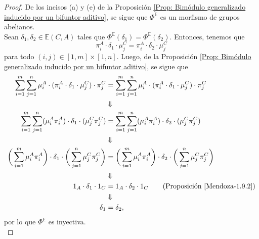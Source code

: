 \documentclass[tesis]{subfiles}
\begin{document}
\begin{proof}

    De los incisos (a) y (e) de la Proposición \ref{Prop: Bimódulo generalizado inducido por un bifuntor aditivo}, se sigue que $\Phi^\mathbb{E}$ es un morfismo de grupos abelianos. \\

    Sean $\delta_1,\delta_2\in\mathbb{E}(C,A)$ tales que $\Phi^\mathbb{E}(\delta_1) = \Phi^\mathbb{E}(\delta_2)$. Entonces, tenemos que
    \begin{equation*}
        \pi_i^A\cdot\delta_1\cdot\mu_j^C = \pi_i^A\cdot\delta_2\cdot\mu_j^C
    \end{equation*}
    para todo $(i,j)\in[1,m]\times[1,n]$. Luego, de la Proposición \ref{Prop: Bimódulo generalizado inducido por un bifuntor aditivo}, se sigue que
    \begin{align*}
        \sum_{i=1}^m \sum_{j=1}^n \mu_i^A\cdot(\pi_i^A\cdot\delta_1\cdot\mu_j^C)\cdot\pi_j^C &= \sum_{i=1}^m \sum_{j=1}^n \mu_i^A\cdot(\pi_i^A\cdot\delta_1\cdot\mu_j^C)\cdot\pi_j^C \\
                                                                                             &\Downarrow \\
        \sum_{i=1}^m \sum_{j=1}^n (\mu_i^A\pi_i^A)\cdot\delta_1\cdot(\mu_j^C\pi_j^C) &= \sum_{i=1}^m \sum_{j=1}^n (\mu_i^A\pi_i^A)\cdot\delta_2\cdot(\mu_j^C\pi_j^C) \\
                                                                                             &\Downarrow \\
        \bigg(\sum_{i=1}^m \mu_i^A\pi_i^A\bigg)\cdot\delta_1\cdot\bigg(\sum_{j=1}^n \mu_j^C\pi_j^C\bigg) &= \bigg(\sum_{i=1}^m \mu_i^A\pi_i^A\bigg)\cdot\delta_2\cdot\bigg(\sum_{j=1}^n \mu_j^C\pi_j^C\bigg) \\
                                                                                     &\Downarrow \\
        1_A\cdot\delta_1\cdot1_C &= 1_A\cdot\delta_2\cdot1_C \tag{Proposición \ref{Mendoza-1.9.2}} \\
                                 &\Downarrow \\
        \delta_1 &= \delta_2,
    \end{align*}
    por lo que $\Phi^\mathbb{E}$ es inyectiva. \\


\end{proof}
\end{document}
